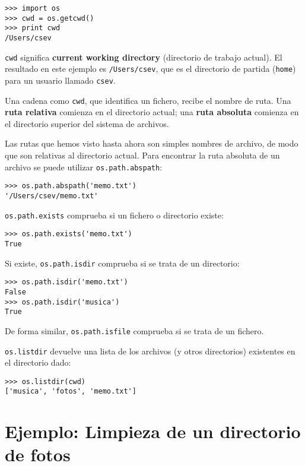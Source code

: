 \beforeverb
\begin{verbatim}
>>> import os
>>> cwd = os.getcwd()
>>> print cwd
/Users/csev
\end{verbatim}
\afterverb
%
{\tt cwd} significa {\bf current working directory} (directorio de trabajo actual). El resultado en
este ejemplo es {\tt /Users/csev}, que es el directorio de partida ({\tt home}) para un
usuario llamado {\tt csev}.


Una cadena como {\tt cwd}, que identifica un fichero, recibe el nombre de ruta.
Una {\bf ruta relativa} comienza en el directorio actual;
una {\bf ruta absoluta} comienza en el directorio superior del
sistema de archivos.


Las rutas que hemos visto hasta ahora son simples nombres de archivo, de modo que
son relativas al directorio actual. Para encontrar la ruta absoluta de
un archivo se puede utilizar {\tt os.path.abspath}:

\beforeverb
\begin{verbatim}
>>> os.path.abspath('memo.txt')
'/Users/csev/memo.txt'
\end{verbatim}
\afterverb
%
{\tt os.path.exists} comprueba
si un fichero o directorio existe:


\beforeverb
\begin{verbatim}
>>> os.path.exists('memo.txt')
True
\end{verbatim}
\afterverb
%
Si existe, {\tt os.path.isdir} comprueba si se trata de un directorio:

\beforeverb
\begin{verbatim}
>>> os.path.isdir('memo.txt')
False
>>> os.path.isdir('musica')
True
\end{verbatim}
\afterverb
%
De forma similar, {\tt os.path.isfile} comprueba si se trata de un fichero.

{\tt os.listdir} devuelve una lista de los archivos (y otros directorios)
existentes en el directorio dado:

\beforeverb
\begin{verbatim}
>>> os.listdir(cwd)
['musica', 'fotos', 'memo.txt']
\end{verbatim}
\afterverb
%


\section{Ejemplo: Limpieza de un directorio de fotos}

